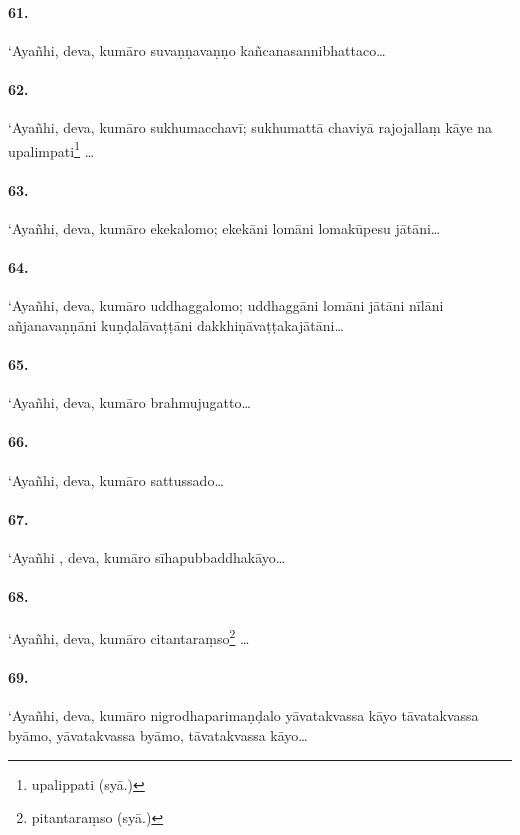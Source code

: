 \paragraph{61.} ‘Ayañhi, deva, kumāro suvaṇṇavaṇṇo kañcanasannibhattaco…

\paragraph{62.} ‘Ayañhi, deva, kumāro sukhumacchavī; sukhumattā chaviyā rajojallaṃ kāye na upalimpati\footnote{upalippati (syā.)} …

\paragraph{63.} ‘Ayañhi, deva, kumāro ekekalomo; ekekāni lomāni lomakūpesu jātāni…

\paragraph{64.} ‘Ayañhi, deva, kumāro uddhaggalomo; uddhaggāni lomāni jātāni nīlāni añjanavaṇṇāni kuṇḍalāvaṭṭāni dakkhiṇāvaṭṭakajātāni…

\paragraph{65.} ‘Ayañhi, deva, kumāro brahmujugatto…

\paragraph{66.} ‘Ayañhi, deva, kumāro sattussado…

\paragraph{67.} ‘Ayañhi , deva, kumāro sīhapubbaddhakāyo…

\paragraph{68.} ‘Ayañhi, deva, kumāro citantaraṃso\footnote{pitantaraṃso (syā.)} …

\paragraph{69.} ‘Ayañhi, deva, kumāro nigrodhaparimaṇḍalo yāvatakvassa kāyo tāvatakvassa byāmo, yāvatakvassa byāmo, tāvatakvassa kāyo…

